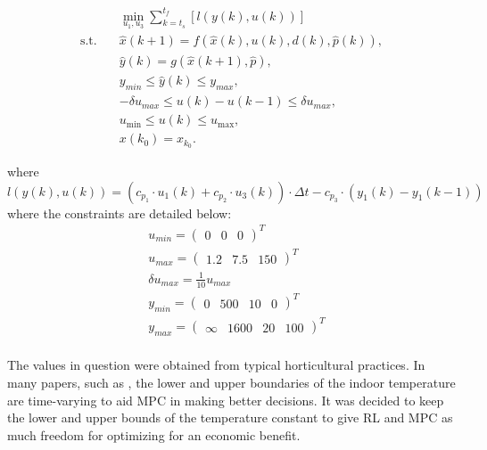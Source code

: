 \begin{subequations} \label{eq:optimisation-goal}
	\begin{align}
		& \min_{u_1,u_3} \sum_{k = t_s}^{t_f} \left[ l(y(k),u(k)) \right] \label{eq:stage-cost-epi} \\
		\text{s.t.} \quad 
		& \hat{x}(k+1) = f(\hat{x}(k), u(k), d(k), \hat{p}(k)), \label{eq:constraint-1} \\
		& \hat{y}(k) = g(\hat{x}(k+1), \hat{p}), \label{eq:constraint-dynamics} \\
		& y_{min} \leq \hat{y}(k) \leq y_{max}, \label{eq:constraint-1} \\
		& -\delta u_{max} \leq u(k) - u(k-1) \leq \delta u_{max}, \label{eq:constraint-delta-u} \\
		& u_{\min} \leq u(k) \leq u_{\max}, \label{eq:constraint-u-limits} \\
		& x(k_0) = x_{k_0}. \label{eq:constraint-initial}
	\end{align}
\end{subequations}

where 
\begin{equation}\label{eq:stage_cost}
	l(y(k),u(k)) = (c_{p_1} \cdot u_1(k) + c_{p_2} \cdot u_3(k)) \cdot \Delta t  - c_{p_3} \cdot (y_1(k) - y_1(k-1))
\end{equation}
where the constraints are detailed below:
\begin{equation}\label{eq:constraints}
	\begin{aligned}
		&u_{min} = \begin{pmatrix}
			0&0&0
		\end{pmatrix}^T \\
		&u_{max} = \begin{pmatrix}
			1.2&7.5&150
		\end{pmatrix}^T	\\
		& \delta u_{max} = \frac{1}{10} u_{max}\\
		&y_{min} = \begin{pmatrix}
			0&500&10&0
		\end{pmatrix}^T \\
		&y_{max} = \begin{pmatrix}
			\infty&1600&20&100
		\end{pmatrix}^T	\\
	\end{aligned}
\end{equation}

The values in question were obtained from typical horticultural practices. In many papers, such as \citet{boersmaRobustSamplebasedModel2022}, the lower and upper boundaries of the indoor temperature are time-varying to aid MPC in making better decisions. It was decided to keep the lower and upper bounds of the temperature constant to give RL and MPC as much freedom for optimizing for an economic benefit.

